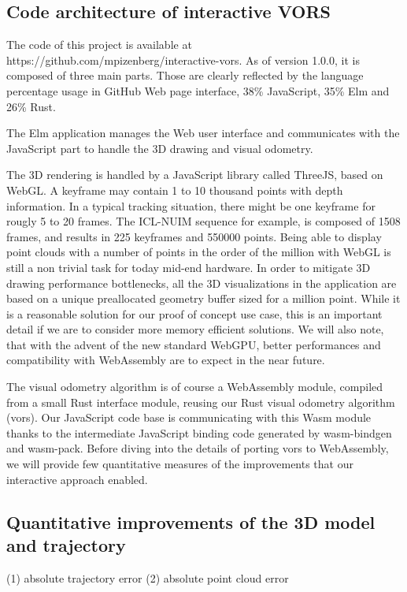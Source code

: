 \subsection{Code architecture of interactive VORS}%
\label{sub:code-interactive-vors}

The code of this project is available at https://github.com/mpizenberg/interactive-vors.
As of version 1.0.0, it is composed of three main parts.
Those are clearly reflected by the language percentage usage in GitHub Web page interface,
38\% JavaScript, 35\% Elm and 26\% Rust.

The Elm application manages the Web user interface and communicates
with the JavaScript part to handle the 3D drawing and visual odometry.

The 3D rendering is handled by a JavaScript library called ThreeJS, based on WebGL.
A keyframe may contain 1 to 10 thousand points with depth information.
In a typical tracking situation, there might be one keyframe for rougly 5 to 20 frames.
The ICL-NUIM sequence for example, is composed of 1508 frames,
and results in 225 keyframes and 550000 points.
Being able to display point clouds with a number of points in the order of the million
with WebGL is still a non trivial task for today mid-end hardware.
In order to mitigate 3D drawing performance bottlenecks,
all the 3D visualizations in the application are based on a unique preallocated
geometry buffer sized for a million point.
While it is a reasonable solution for our proof of concept use case,
this is an important detail if we are to consider more memory efficient solutions.
We will also note, that with the advent of the new standard WebGPU,
better performances and compatibility with WebAssembly are to expect in the near future.

The visual odometry algorithm is of course a WebAssembly module,
compiled from a small Rust interface module,
reusing our Rust visual odometry algorithm (vors).
Our JavaScript code base is communicating with this Wasm module
thanks to the intermediate JavaScript binding code generated by wasm-bindgen and wasm-pack.
Before diving into the details of porting vors to WebAssembly,
we will provide few quantitative measures of the improvements that our interactive
approach enabled.

\subsection{Quantitative improvements of the 3D model and trajectory}%
\label{sub:quantitative-improvements}

(1) absolute trajectory error
(2) absolute point cloud error
